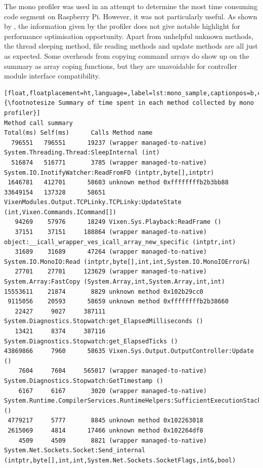 The mono profiler was used in an attempt to determine the most time consuming code segment on Raspberry Pi. However, it was not particularly useful. As shown by , the information given by the profiler does not give notable highlight for performance optimisation opportunity. Apart from unhelpful unknown methods, the thread sleeping method, file reading methods and update methods are all just as expected. Some overheads from copying command arrays do show up on the summary as array coping functions, but they are unavoidable for controller module interface compatibility.

\begin{lstlisting}[float,floatplacement=ht,language=,label=lst:mono_sample,captionpos=b,caption={\footnotesize Summary of time spent in each method collected by mono profiler}]
Method call summary
Total(ms) Self(ms)      Calls Method name
  796551   796551      19237 (wrapper managed-to-native) System.Threading.Thread:SleepInternal (int)
  516874   516771       3785 (wrapper managed-to-native) System.IO.InotifyWatcher:ReadFromFD (intptr,byte[],intptr)
 1646781   412701      58603 unknown method 0xffffffffb2b3bb88
33649154   137328      58651 VixenModules.Output.TCPLinky.TCPLinky:UpdateState (int,Vixen.Commands.ICommand[])
   94269    57976      18249 Vixen.Sys.Playback:ReadFrame ()
   37151    37151     188864 (wrapper managed-to-native) object:__icall_wrapper_ves_icall_array_new_specific (intptr,int)
   31689    31689      47264 (wrapper managed-to-native) System.IO.MonoIO:Read (intptr,byte[],int,int,System.IO.MonoIOError&)
   27701    27701     123629 (wrapper managed-to-native) System.Array:FastCopy (System.Array,int,System.Array,int,int)
15553611    21874       8829 unknown method 0x102b29cc0
 9115056    20593      58659 unknown method 0xffffffffb2b38660
   22427     9027     387111 System.Diagnostics.Stopwatch:get_ElapsedMilliseconds ()
   13421     8374     387116 System.Diagnostics.Stopwatch:get_ElapsedTicks ()
43869866     7960      58635 Vixen.Sys.Output.OutputController:Update ()
    7604     7604     565017 (wrapper managed-to-native) System.Diagnostics.Stopwatch:GetTimestamp ()
    6167     6167       3020 (wrapper managed-to-native) System.Runtime.CompilerServices.RuntimeHelpers:SufficientExecutionStack ()
 4779217     5777       8845 unknown method 0x102263018
 2615069     4814      17466 unknown method 0x102264df8
    4509     4509       8821 (wrapper managed-to-native) System.Net.Sockets.Socket:Send_internal (intptr,byte[],int,int,System.Net.Sockets.SocketFlags,int&,bool)
\end{lstlisting}
